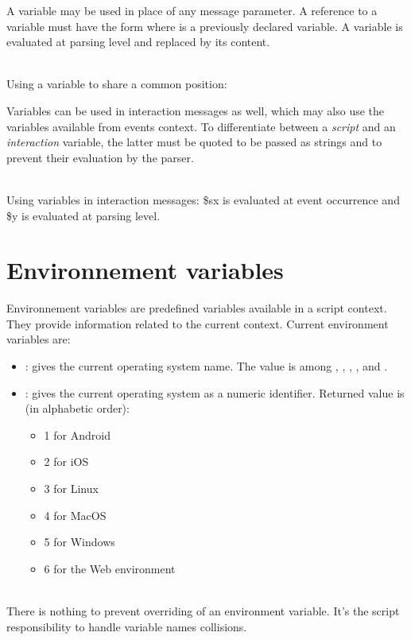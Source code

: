 \documentclass[a4paper,twoside]{report}
\newcommand{\sublevel}[1]	{\section{#1}}
\begin{document}
A variable may be used in place of any message parameter. A reference to a variable must have the form  where  is a previously declared variable. A variable is evaluated at parsing level and replaced by its content.

\example \\
Using a variable to share a common position:

Variables can be used in interaction messages as well, which may also use the variables available from events context. To differentiate between a \emph{script} and an \emph{interaction} variable, the latter must be quoted to be passed as strings and to prevent their evaluation by the parser. 

\example \\
Using variables in interaction messages: \$sx is evaluated at event occurrence	and \$y is evaluated at parsing level.

\sublevel{Environnement variables}
\label{envvar}

Environnement variables are predefined variables available in a script context. They provide information related to the current context. Current environment variables are:
\begin{itemize}
\item \textbf{}: gives the current operating system name. The value is among , , , ,  and .
\item \textbf{} : gives the current operating system as a numeric identifier. Returned value is (in alphabetic order): 
\begin{itemize}
\item 1 for Android
\item 2 for iOS
\item 3 for Linux 
\item 4 for MacOS 
\item 5 for Windows 
\item 6 for the Web environment 
\end{itemize}
\end{itemize}

\note\\
There is nothing to prevent overriding of an environment variable. It's the script responsibility to handle variable names collisions.
\end{document}
